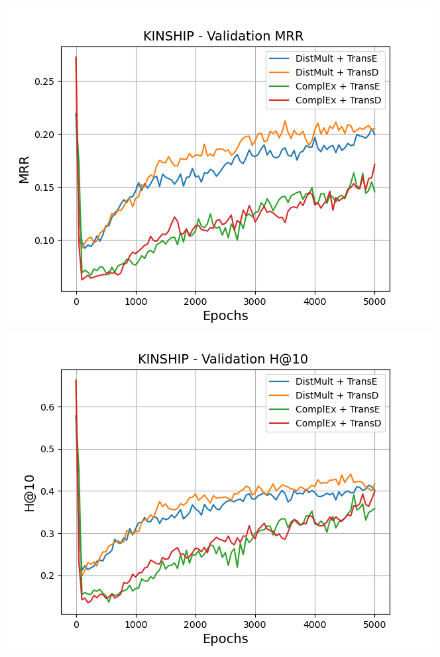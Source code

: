 \begin{figure}
    \centering
    \begin{minipage}{.5\textwidth}
      \centering
      \includegraphics[width=\linewidth]{figures/results/gan_train/pretrained/uncertainty/max/entropy/kinship/5k_epochs/uncertainty_kinship_mrrs.png}
    \end{minipage}%
    \begin{minipage}{.5\textwidth}
      \centering
      \includegraphics[width=\linewidth]{figures/results/gan_train/pretrained/uncertainty/max/entropy/kinship/5k_epochs/uncertainty_kinship_hit10.png}
    \end{minipage}
    

\end{figure}
